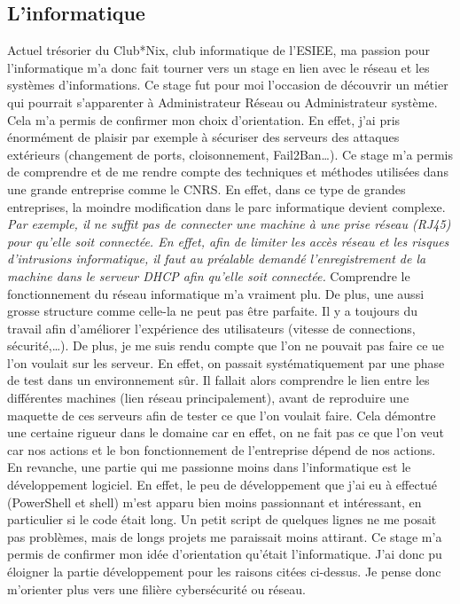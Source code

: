 \subsection{L'informatique}
Actuel trésorier du Club*Nix, club informatique de l'ESIEE, ma passion pour l'informatique m'a donc fait tourner vers un stage en lien avec le réseau et les systèmes d'informations. 
Ce stage fut pour moi l'occasion de découvrir un métier qui pourrait s'apparenter à Administrateur Réseau ou Administrateur système. Cela m'a permis de confirmer mon choix d'orientation. En effet, j'ai pris énormément de plaisir par exemple à sécuriser des serveurs des attaques extérieurs (changement de ports, cloisonnement, Fail2Ban\dots). Ce stage m'a permis de comprendre et de me rendre compte des techniques et méthodes utilisées dans une grande entreprise comme le CNRS. En effet, dans ce type de grandes entreprises, la moindre modification dans le parc informatique devient complexe. \textit{Par exemple, il ne suffit pas de connecter une machine à une prise réseau (RJ45) pour qu'elle soit connectée. En effet, afin de limiter les accès réseau et les risques d'intrusions informatique, il faut au préalable demandé l'enregistrement de la machine dans le serveur DHCP afin qu'elle soit connectée.} Comprendre le fonctionnement du réseau informatique m'a vraiment plu. De plus, une aussi grosse structure comme celle-la ne peut pas être parfaite. Il y a toujours du travail afin d'améliorer l'expérience des utilisateurs (vitesse de connections, sécurité,\ldots). 
\medbreak
De plus, je me suis rendu compte que l'on ne pouvait pas faire ce ue l'on voulait sur les serveur. En effet, on passait systématiquement par une phase de test dans un environnement sûr. Il fallait alors comprendre le lien entre les différentes machines (lien réseau principalement), avant de reproduire une maquette de ces serveurs afin de tester ce que l'on voulait faire. Cela démontre une certaine rigueur dans le domaine car en effet, on ne fait pas ce que l'on veut car nos actions et le bon fonctionnement de l'entreprise dépend de nos actions.
\medbreak
En revanche, une partie qui me passionne moins dans l'informatique est le développement logiciel. En effet, le peu de développement que j'ai eu à effectué (PowerShell et shell) m'est apparu bien moins passionnant et intéressant, en particulier si le code était long. Un petit script de quelques lignes ne me posait pas problèmes, mais de longs projets me paraissait moins attirant. 
\medbreak
Ce stage m'a permis de confirmer mon idée d'orientation qu'était l'informatique. J'ai donc pu éloigner la partie développement pour les raisons citées ci-dessus. Je pense donc m'orienter plus vers une filière cybersécurité ou réseau. 
 
